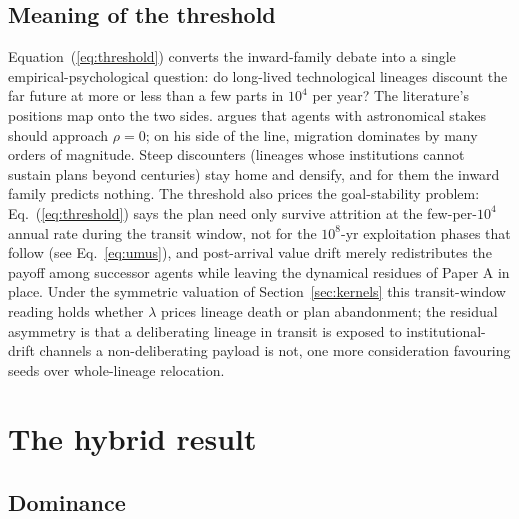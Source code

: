 \documentclass[11pt]{article}
\begin{document}
\subsection{Meaning of the threshold}

Equation~(\ref{eq:threshold}) converts the inward-family debate into a single empirical-psychological question: do long-lived technological lineages discount the far future at more or less than a few parts in $10^{4}$ per year? The literature's positions map onto the two sides. \citet{Bostrom2003} argues that agents with astronomical stakes should approach $\rho = 0$; on his side of the line, migration dominates by many orders of magnitude. Steep discounters (lineages whose institutions cannot sustain plans beyond centuries) stay home and densify, and for them the inward family predicts nothing. The threshold also prices the goal-stability problem: Eq.~(\ref{eq:threshold}) says the plan need only survive attrition at the few-per-$10^{4}$ annual rate during the transit window, not for the $10^{8}$-yr exploitation phases that follow (see Eq.~\ref{eq:umus}), and post-arrival value drift merely redistributes the payoff among successor agents while leaving the dynamical residues of Paper A in place. Under the symmetric valuation of Section~\ref{sec:kernels} this transit-window reading holds whether $\lambda$ prices lineage death or plan abandonment; the residual asymmetry is that a deliberating lineage in transit is exposed to institutional-drift channels a non-deliberating payload is not, one more consideration favouring seeds over whole-lineage relocation.

\section{The hybrid result}
\label{sec:hybrid}

\subsection{Dominance}
\end{document}
